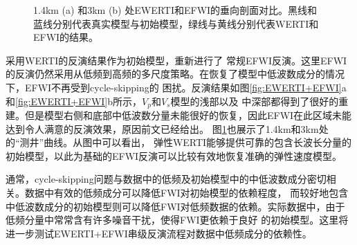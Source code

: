 \begin{figure}[!htb]
   \centering
   \caption{
	   1.4km (a) 和3km (b) 处EWERTI和EFWI的垂向剖面对比。黑线和蓝线分别代表真实模型与初始模型，绿线与黄线分别代表WERTI和EFWI的结果。
   }
   \label{fig:Profiles}
\end{figure}

采用WERTI的反演结果作为初始模型，重新进行了
常规EFWI反演。这里EFWI的反演仍然采用从低频到高频的多尺度策略。在恢复了模型中低波数成分的情况下，EFWI不再受到cycle-skipping的
困扰。反演结果如图\ref{fig:EWERTI+EFWI}a和\ref{fig:EWERTI+EFWI}b所示，$V_p$和$V_s$模型的浅部以及
中深部都得到了很好的重建。但是模型右侧和底部中低波数分量未能很好的恢复，因此EFWI在此区域未能达到令人满意的反演效果，原因前文已经给出。
图\ref{fig:Profiles}也展示了1.4km和3km处
的“测井”曲线。从图中可以看出，
弹性WERTI能够提供可靠的包含长波长分量的初始模型，以此为基础的EFWI反演可以比较有效地恢复准确的弹性速度模型。

通常，cycle-skipping问题与数据中的低频及初始模型中的中低波数成分密切相关。数据中有效的低频成分可以降低FWI对初始模型的依赖程度，
而较好地包含中低波数成分的初始模型则可以降低FWI对低频数据的依赖。实际数据中，由于低频分量中常常含有许多噪音干扰，使得FWI更依赖于良好
的初始模型。这里将进一步测试EWERTI+EFWI串级反演流程对数据中低频成分的依赖性。

